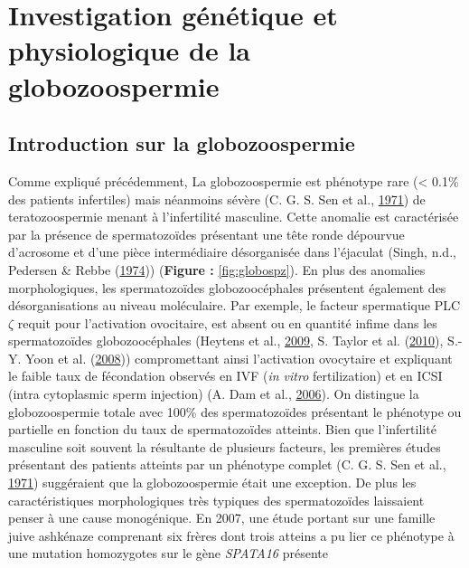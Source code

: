 \documentclass[12pt,twoside]{reedthesis}
\theoremstyle{definition}
\theoremstyle{definition}
\theoremstyle{remark}
\begin{document}
  \hypertarget{globo}{\chapter{Investigation génétique et physiologique de
  la globozoospermie}\label{globo}}
  
  \section{Introduction sur la
  globozoospermie}\label{introduction-sur-la-globozoospermie}
  
  Comme expliqué précédemment, La globozoospermie est phénotype rare
  (\textless{} 0.1\% des patients infertiles) mais néanmoins sévère (C. G.
  S. Sen et al., \protect\hyperlink{ref-Sen2009}{1971}) de
  teratozoospermie menant à l'infertilité masculine. Cette anomalie est
  caractérisée par la présence de spermatozoïdes présentant une tête ronde
  dépourvue d'acrosome et d'une pièce intermédiaire désorganisée dans
  l'éjaculat (Singh, n.d., Pedersen \& Rebbe
  (\protect\hyperlink{ref-Pedersen1974}{1974})) (\textbf{Figure :
  }\ref{fig:globospz}). En plus des anomalies morphologiques, les
  spermatozoïdes globozoocéphales présentent également des
  désorganisations au niveau moléculaire. Par exemple, le facteur
  spermatique PLC\(\zeta\) requit pour l'activation ovocitaire, est absent
  ou en quantité infime dans les spermatozoïdes globozoocéphales (Heytens
  et al., \protect\hyperlink{ref-Heytens2009}{2009}, S. Taylor et al.
  (\protect\hyperlink{ref-Taylor2010}{2010}), S.-Y. Yoon et al.
  (\protect\hyperlink{ref-Yoon2008}{2008})) compromettant ainsi
  l'activation ovocytaire et expliquant le faible taux de fécondation
  observés en IVF (\emph{in vitro} fertilization) et en ICSI (intra
  cytoplasmic sperm injection) (A. Dam et al.,
  \protect\hyperlink{ref-Dam2006}{2006}). On distingue la globozoospermie
  totale avec 100\% des spermatozoïdes présentant le phénotype ou
  partielle en fonction du taux de spermatozoïdes atteints. Bien que
  l'infertilité masculine soit souvent la résultante de plusieurs
  facteurs, les premières études présentant des patients atteints par un
  phénotype complet (C. G. S. Sen et al.,
  \protect\hyperlink{ref-Sen2009}{1971}) suggéraient que la
  globozoospermie était une exception. De plus les caractéristiques
  morphologiques très typiques des spermatozoïdes laissaient penser à une
  cause monogénique. En 2007, une étude portant sur une famille juive
  ashkénaze comprenant six frères dont trois atteins a pu lier ce
  phénotype à une mutation homozygotes sur le gène \emph{SPATA16} présente
\end{document}
